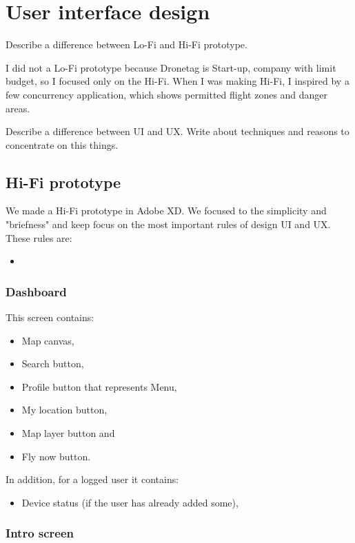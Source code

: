 \chapter{User interface design}\label{ch:user-interface-design}

Describe a difference between Lo-Fi and Hi-Fi prototype.

I did not a Lo-Fi prototype because Dronetag is Start-up, company with limit budget, so I focused only on the Hi-Fi.
When I was making Hi-Fi, I inspired by a few concurrency application, which shows permitted flight zones and danger areas.

Describe a difference between UI and UX.
Write about techniques and reasons to concentrate on this things.

\section{Hi-Fi prototype}\label{sec:hi-fi-prototype}
We made a Hi-Fi prototype in Adobe XD.
We focused to the simplicity and "briefness" and keep focus on the most important rules of design UI and UX.
These rules are:
\begin{itemize}
    \item
\end{itemize}

\subsection{Dashboard}\label{subsec:dashboard2}
This screen contains:
\begin{itemize}
    \item Map canvas,
    \item Search button,
    \item Profile button that represents Menu,
    \item My location button,
    \item Map layer button and
    \item Fly now button.
\end{itemize}
In addition, for a logged user it contains:
\begin{itemize}
    \item Device status (if the user has already added some),
\end{itemize}

\subsection{Intro screen}\label{subsec:intro-screen}


